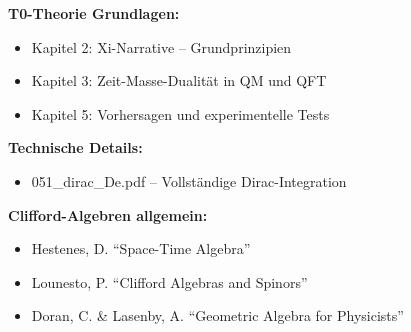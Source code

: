 	\textbf{T0-Theorie Grundlagen:}
	\begin{itemize}
		\item Kapitel 2: Xi-Narrative -- Grundprinzipien
		\item Kapitel 3: Zeit-Masse-Dualität in QM und QFT
		\item Kapitel 5: Vorhersagen und experimentelle Tests
	\end{itemize}
	
	\textbf{Technische Details:}
	\begin{itemize}
		\item 051\_dirac\_De.pdf -- Vollständige Dirac-Integration
	\end{itemize}
	
	\textbf{Clifford-Algebren allgemein:}
	\begin{itemize}
		\item Hestenes, D. ``Space-Time Algebra''
		\item Lounesto, P. ``Clifford Algebras and Spinors''
		\item Doran, C. \& Lasenby, A. ``Geometric Algebra for Physicists''
	\end{itemize}
	